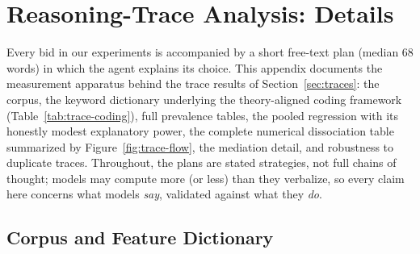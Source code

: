 \section{Reasoning-Trace Analysis: Details}\label{app:traces}

Every bid in our experiments is accompanied by a short free-text plan (median 68 words) in which the agent explains its choice. This appendix documents the measurement apparatus behind the trace results of Section~\ref{sec:traces}: the corpus, the keyword dictionary underlying the theory-aligned coding framework (Table~\ref{tab:trace-coding}), full prevalence tables, the pooled regression with its honestly modest explanatory power, the complete numerical dissociation table summarized by Figure~\ref{fig:trace-flow}, the mediation detail, and robustness to duplicate traces. Throughout, the plans are stated strategies, not full chains of thought; models may compute more (or less) than they verbalize, so every claim here concerns what models \emph{say}, validated against what they \emph{do}.

\subsection{Corpus and Feature Dictionary}\label{app:traces-dictionary}

